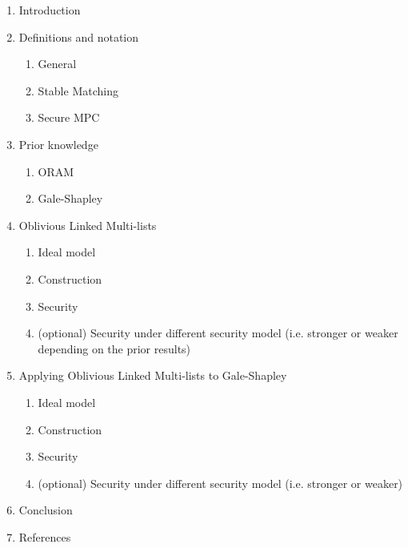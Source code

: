 \begin{enumerate}
  \item Introduction
  \item Definitions and notation
  \begin{enumerate}
    \item General
    \item Stable Matching
    \item Secure MPC
  \end{enumerate}
  \item Prior knowledge
  \begin{enumerate}
    \item ORAM
    \item Gale-Shapley
  \end{enumerate}
  \item Oblivious Linked Multi-lists
  \begin{enumerate}
  	\item Ideal model
    \item Construction
    \item Security
    \item \color{gray}(optional) Security under different security model (i.e. stronger or weaker depending on the prior results)
  \end{enumerate}
  \item Applying Oblivious Linked Multi-lists to Gale-Shapley
  \begin{enumerate}
    \item Ideal model
    \item Construction
    \item Security
    \item \color{gray}(optional) Security under different security model (i.e. stronger or weaker)
  \end{enumerate}
  \item Conclusion
  \item References
\end{enumerate}